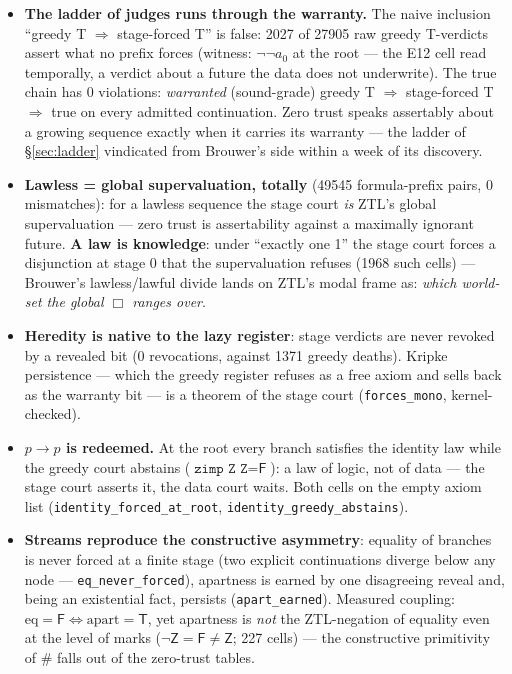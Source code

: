 \documentclass[11pt]{article}
\theoremstyle{remark}
\newcommand{\vT}{\textsf{T}}
\newcommand{\vF}{\textsf{F}}
\newcommand{\vZ}{\textsf{Z}}
\begin{document}
\begin{itemize}
\item \textbf{The ladder of judges runs through the warranty.} The naive
inclusion ``greedy \vT{} $\Rightarrow$ stage-forced \vT'' is false: 2027 of
27905 raw greedy \vT-verdicts assert what no prefix forces (witness:
$\lnot\lnot a_0$ at the root --- the E12 cell read temporally, a verdict
about a future the data does not underwrite). The true chain has 0
violations: \emph{warranted} (sound-grade) greedy \vT{} $\Rightarrow$
stage-forced \vT{} $\Rightarrow$ true on every admitted continuation. Zero
trust speaks assertably about a growing sequence exactly when it carries
its warranty --- the ladder of \S\ref{sec:ladder} vindicated from Brouwer's
side within a week of its discovery.
\item \textbf{Lawless = global supervaluation, totally} (49545
formula-prefix pairs, 0 mismatches): for a lawless sequence the stage court
\emph{is} ZTL's global supervaluation --- zero trust is assertability
against a maximally ignorant future. \textbf{A law is knowledge}: under
``exactly one 1'' the stage court forces a disjunction at stage 0 that the
supervaluation refuses (1968 such cells) --- Brouwer's lawless/lawful
divide lands on ZTL's modal frame as: \emph{which world-set the global
$\Box$ ranges over}.
\item \textbf{Heredity is native to the lazy register}: stage verdicts are
never revoked by a revealed bit (0 revocations, against 1371 greedy
deaths). Kripke persistence --- which the greedy register refuses as a free
axiom and sells back as the warranty bit --- is a theorem of the stage
court (\texttt{forces\_mono}, kernel-checked).
\item \textbf{$p \to p$ is redeemed.} At the root every branch satisfies
the identity law while the greedy court abstains ($\texttt{zimp Z Z} =
\vF$): a law of logic, not of data --- the stage court asserts it, the data
court waits. Both cells on the empty axiom list
(\texttt{identity\_forced\_at\_root}, \texttt{identity\_greedy\_abstains}).
\item \textbf{Streams reproduce the constructive asymmetry}: equality of
branches is never forced at a finite stage (two explicit continuations
diverge below any node --- \texttt{eq\_never\_forced}), apartness is earned
by one disagreeing reveal and, being an existential fact, persists
(\texttt{apart\_earned}). Measured coupling: $\mathrm{eq}=\vF \iff
\mathrm{apart}=\vT$, yet apartness is \emph{not} the ZTL-negation of
equality even at the level of marks ($\lnot\vZ=\vF\neq\vZ$; 227 cells) ---
the constructive primitivity of $\#$ falls out of the zero-trust tables.
\end{itemize}
\end{document}
